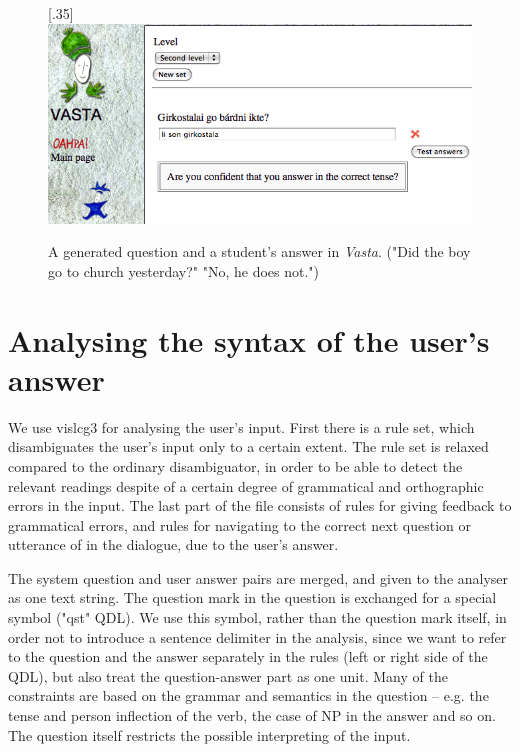 \documentclass[11pt]{article}
\begin{document}
\begin{figure}%
\begin{center}
\scalebox{.35}[.35]{\includegraphics{presentation/img/Vasta_sentencegen_example.png}}\\
\caption{A generated question and a student's answer in \textit{Vasta}. ("Did the boy go to church yesterday?" 
"No, he does not.")}
\label{vastasent}
\end{center}
\end{figure}
 
\section{Analysing the syntax of the user's answer} 
We use vislcg3 for analysing the user's input. First there is a rule set, which disambiguates the user's input only to a certain extent. The rule set is relaxed compared to the ordinary disambiguator, in order to be able to detect the relevant readings despite of a certain degree of grammatical and orthographic errors in the input. The last part of the file consists of rules for giving feedback to grammatical errors, and rules for navigating to the correct next question or utterance of in the dialogue, due to the user's answer.  

The system question and user answer pairs are merged, and given to the analyser as one text string. The question mark in the question is exchanged for a special symbol ("qst" QDL). We use this symbol, rather than the question mark itself, in order not to introduce a sentence delimiter in the analysis, since we want to refer to the question and the answer separately in the rules (left or right side of the QDL), but also treat the question-answer part as one unit. Many of the constraints are based on the grammar and semantics in the question -- e.g. the tense and person inflection of the verb, the case of NP in the answer and so on. The question itself restricts the possible interpreting of the input.
\end{document}
